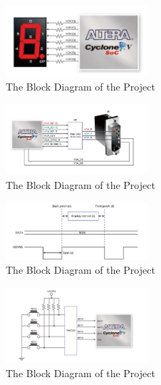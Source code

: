 \documentclass[paper]{IEEEtran}
\begin{document}
\begin{figure}[h!]
	\setlength{\unitlength}{\textwidth}
	\center 
	\includegraphics[width=0.47\textwidth]{SSD}
	\caption{\label{fig:SSD}The Block Diagram of the Project}
\end{figure}


\begin{figure}[h!]
	\setlength{\unitlength}{\textwidth}
	\center 
	\includegraphics[width=0.47\textwidth]{VGA_config}
	\caption{\label{fig:VGA_config}The Block Diagram of the Project}
\end{figure}

\begin{figure}[h!]
	\setlength{\unitlength}{\textwidth}
	\center 
	\includegraphics[width=0.47\textwidth]{VGA_hoztim}
	\caption{\label{fig:VGA_hoztim}The Block Diagram of the Project}
\end{figure}

\begin{figure}[h!]
	\setlength{\unitlength}{\textwidth}
	\center 
	\includegraphics[width=0.47\textwidth]{push_buttons}
	\caption{\label{fig:push_buttons}The Block Diagram of the Project}
\end{figure}
\end{document}
